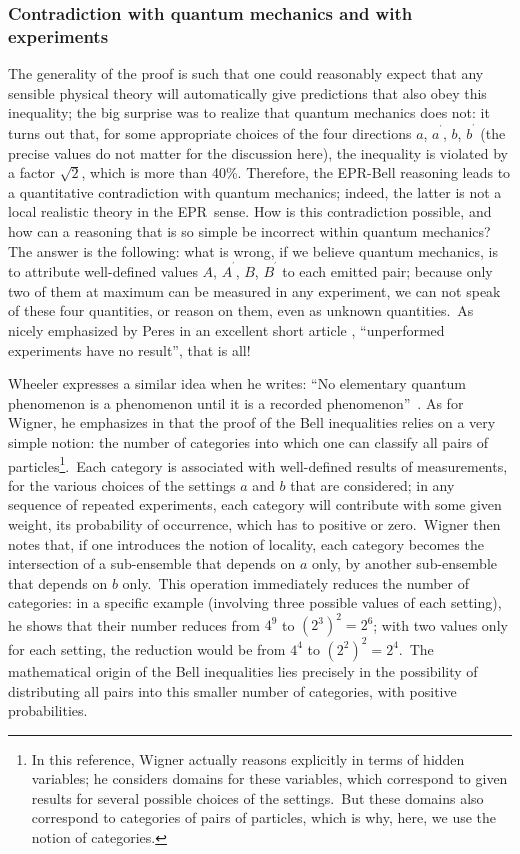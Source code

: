 \documentclass[12pt,onecolumn]{article}%
\begin{document}
\subsubsection{Contradiction with quantum mechanics and with experiments}

\label{contradictions}

The generality of the proof is such that one could reasonably expect that any
sensible physical theory will automatically give predictions that also obey
this inequality; the big surprise was to realize that quantum mechanics does
not: it turns out that, for some appropriate choices of the four directions
$a$, $a^{^{\prime}}$, $b$, $b^{^{\prime}}$ (the precise values do not matter
for the discussion here), the inequality is violated by a factor $\sqrt{2}$,
which is more than 40\%. Therefore, the EPR-Bell reasoning leads to a
quantitative contradiction with quantum mechanics; indeed, the latter is not a
local realistic theory in the EPR\ sense. How is this contradiction possible,
and how can a reasoning that is so simple be incorrect within quantum
mechanics? The answer is the following: what is wrong, if we believe quantum
mechanics, is to attribute well-defined values $A$, $A^{^{\prime}}$, $B$,
$B^{^{\prime}}$ to each emitted pair; because only two of them at maximum can
be measured in any experiment, we can not speak of these four quantities, or
reason on them, even as unknown quantities.\ As nicely emphasized by Peres in
an excellent short article \cite{Peres}, ``unperformed experiments have no
result'', that is all!

Wheeler expresses a similar idea when he writes: \textquotedblleft No
elementary quantum phenomenon is a phenomenon until it is a recorded
phenomenon\textquotedblright\ \cite{Wheeler}. As for Wigner, he emphasizes in
\cite{Wigner-AJP} that the proof of the Bell inequalities relies on a very
simple notion: the number of categories into which one can classify all pairs
of particles\footnote{In this reference, Wigner actually reasons explicitly in
terms of hidden variables; he considers domains for these variables, which
correspond to given results for several possible choices of the settings.\ But
these domains also correspond to categories of pairs of particles, which is
why, here, we use the notion of categories.}.\ Each category is associated
with well-defined results of measurements, for the various choices of the
settings $a$ and $b$ that are considered; in any sequence of repeated
experiments, each category will contribute with some given weight, its
probability of occurrence, which has to positive or zero.\ Wigner then notes
that, if one introduces the notion of locality, each category becomes the
intersection of a sub-ensemble that depends on $a$ only, by another
sub-ensemble that depends on $b$ only.\ This operation immediately reduces the
number of categories: in a specific example (involving three possible values
of each setting), he shows that their number reduces from $4^{9}$ to
$(2^{3})^{2}=2^{6}$; with two values only for each setting, the reduction
would be from $4^{4}$ to $(2^{2})^{2}=2^{4}$.\ The mathematical origin of the
Bell inequalities lies precisely in the possibility of distributing all pairs
into this smaller number of categories, with positive probabilities.
\end{document}
